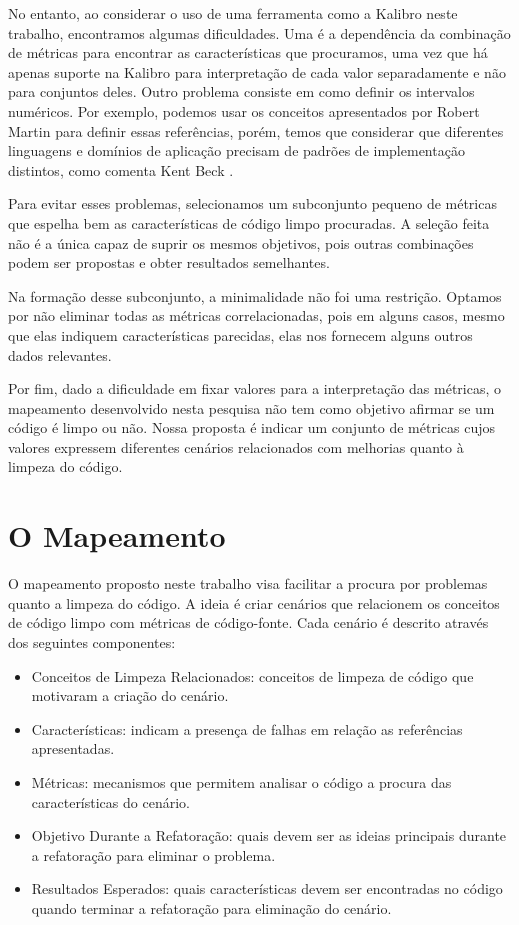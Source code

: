 No entanto, ao considerar o uso de uma ferramenta como a Kalibro neste trabalho, encontramos algumas dificuldades. Uma é a dependência da combinação de métricas para encontrar as características que procuramos, uma vez que há apenas suporte na Kalibro para interpretação de cada valor separadamente e não para conjuntos deles. Outro problema consiste em como definir os intervalos numéricos. Por exemplo, podemos usar os conceitos apresentados por Robert Martin \citep{Martin2008} para definir essas referências, porém, temos que considerar que diferentes linguagens e domínios de aplicação precisam de padrões de implementação distintos, como comenta Kent Beck \citep{Beck2007}.	

Para evitar esses problemas, selecionamos um subconjunto pequeno de métricas que espelha bem as características de código limpo procuradas. A seleção feita não é a única capaz de suprir os mesmos objetivos, pois outras combinações podem ser propostas e obter resultados semelhantes.

Na formação desse subconjunto, a minimalidade não foi uma restrição. Optamos por não eliminar todas as métricas correlacionadas, pois em alguns casos, mesmo que elas indiquem características parecidas, elas nos fornecem alguns outros dados relevantes.

Por fim, dado a dificuldade em fixar valores para a interpretação das métricas, o mapeamento desenvolvido nesta pesquisa não tem como objetivo afirmar se um código é limpo ou não. Nossa proposta é indicar um conjunto de métricas cujos valores expressem diferentes cenários relacionados com melhorias quanto à limpeza do código.
						
	
\section{O Mapeamento}
                    
O mapeamento proposto neste trabalho visa facilitar a procura por problemas quanto a limpeza do código. A ideia é criar cenários que relacionem os conceitos de código limpo com métricas de código-fonte. Cada cenário é descrito através dos seguintes componentes:
	
\begin{itemize}
	\item Conceitos de Limpeza Relacionados: conceitos de limpeza de código que motivaram a criação do cenário.
	\item Características: indicam a presença de falhas em relação as referências apresentadas.
	\item Métricas: mecanismos que permitem analisar o código a procura das características do cenário.
	\item Objetivo Durante a Refatoração: quais devem ser as ideias principais durante a refatoração para eliminar o problema.
	\item Resultados Esperados: quais características devem ser encontradas no código quando terminar a refatoração para eliminação do cenário.
\end{itemize}	


